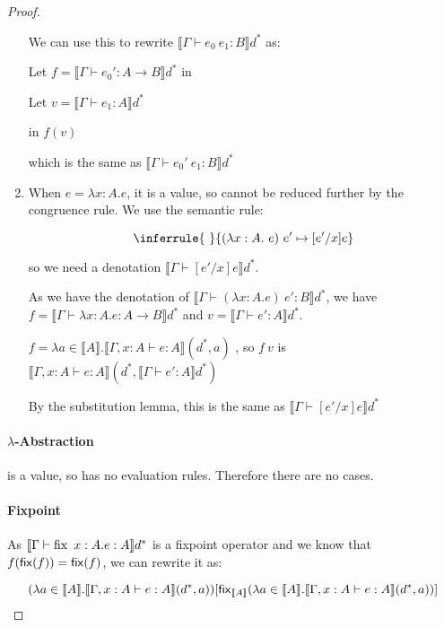 \begin{proof}
\begin{enumerate}
{We can use this to rewrite $\llbracket \Gamma \vdash e_0 \ e_1 : B \rrbracket d^*$ as:

Let $f = \llbracket \Gamma \vdash e_0' : A \to B \rrbracket d^*$ in 

\hspace{4.5cm} Let $v = \llbracket \Gamma \vdash e_1 : A \rrbracket d^*$ 

\hspace{7cm} in $f(v)$

which is the same as $\llbracket \Gamma \vdash e_0' \ e_1 : B \rrbracket d^*$
}
\item{When $e = \lambda x:A.e$, it is a value, so cannot be reduced further by the congruence rule. We use the semantic rule:

$$
\inferrule{ \ }
 {(\lambda x: A .\ e) \ e' \mapsto [e'/x]e}
$$

so we need a denotation $\llbracket \Gamma \vdash [e'/x]e \rrbracket d^*$.

As we have the denotation of $\llbracket \Gamma \vdash (\lambda x:A. e) \ e' : B \rrbracket d^*$, we have $f = \llbracket \Gamma \vdash \lambda x:A. e : A \to B \rrbracket d^*$ and $v = \llbracket \Gamma \vdash e': A  \rrbracket d^*.$

$f = \lambda a \in \llbracket A \rrbracket . \llbracket \Gamma, x : A \vdash e : A \rrbracket(d^*, a)$ , so $f \ v$ is $\llbracket \Gamma, x : A \vdash e : A \rrbracket(d^*, \llbracket \Gamma \vdash e' : A \rrbracket d^*)$

By the substitution lemma, this is the same as $\llbracket \Gamma \vdash [e'/x]e \rrbracket d^*$}
\end{enumerate}

\paragraph{$\lambda$-Abstraction}  is a value, so has no evaluation rules. Therefore there are no cases.

\paragraph{Fixpoint} As $\llbracket \Gamma \vdash \operatorname{fix} \ x:A .e : A \rrbracket d^*$ is a fixpoint operator and we know that $f(\operatorname{\mathsf{fix}}(f)) = \operatorname{\mathsf{fix}}(f)$, we can rewrite it as:

\[(\lambda a \in \llbracket A \rrbracket . \llbracket \Gamma, x : A \vdash e : A \rrbracket(d^*, a))[\operatorname{\mathsf{fix}}_{\llbracket A \rrbracket} (\lambda a \in \llbracket A \rrbracket . \llbracket \Gamma, x : A \vdash e : A \rrbracket(d^*, a))]\]


\end{proof}
